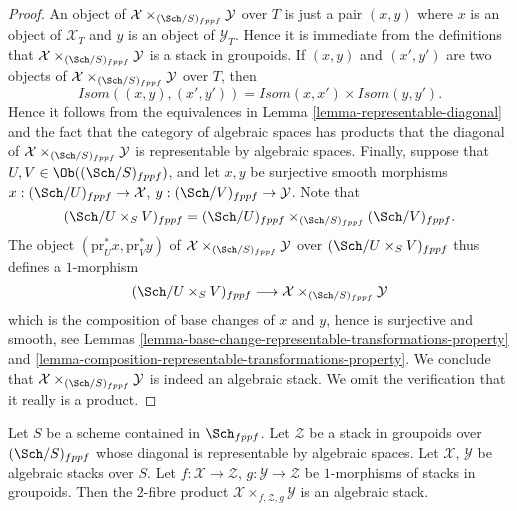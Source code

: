 \begin{proof}
An object of $\mathcal{X} \times_{(\Sch/S)_{fppf}} \mathcal{Y}$
over $T$ is just a pair $(x, y)$ where $x$ is an object of $\mathcal{X}_T$
and $y$ is an object of $\mathcal{Y}_T$. Hence it is immediate from
the definitions that
$\mathcal{X} \times_{(\Sch/S)_{fppf}} \mathcal{Y}$ is a
stack in groupoids. If $(x, y)$ and $(x', y')$ are
two objects of $\mathcal{X} \times_{(\Sch/S)_{fppf}} \mathcal{Y}$
over $T$, then
$$
\mathit{Isom}((x, y), (x', y')) =
\mathit{Isom}(x, x') \times \mathit{Isom}(y, y').
$$
Hence it follows from the equivalences in
Lemma \ref{lemma-representable-diagonal}
and the fact that the category of algebraic spaces has products
that the diagonal of $\mathcal{X} \times_{(\Sch/S)_{fppf}} \mathcal{Y}$
is representable by algebraic spaces.
Finally, suppose that $U, V \in \Ob((\Sch/S)_{fppf})$,
and let $x, y$ be surjective smooth morphisms
$x : (\Sch/U)_{fppf} \to \mathcal{X}$,
$y : (\Sch/V)_{fppf} \to \mathcal{Y}$.
Note that
$$
(\Sch/U \times_S V)_{fppf} =
(\Sch/U)_{fppf}
\times_{(\Sch/S)_{fppf}} (\Sch/V)_{fppf}.
$$
The object $(\text{pr}_U^*x, \text{pr}_V^*y)$ of
$\mathcal{X} \times_{(\Sch/S)_{fppf}} \mathcal{Y}$ over
$(\Sch/U \times_S V)_{fppf}$ thus defines a $1$-morphism
$$
(\Sch/U \times_S V)_{fppf}
\longrightarrow
\mathcal{X} \times_{(\Sch/S)_{fppf}} \mathcal{Y}
$$
which is the composition of base changes of $x$ and $y$, hence
is surjective and smooth, see
Lemmas \ref{lemma-base-change-representable-transformations-property} and
\ref{lemma-composition-representable-transformations-property}.
We conclude that $\mathcal{X} \times_{(\Sch/S)_{fppf}} \mathcal{Y}$
is indeed an algebraic stack. We omit the verification that it
really is a product.
\end{proof}

\begin{lemma}
\label{lemma-2-fibre-product-general}
Let $S$ be a scheme contained in $\Sch_{fppf}$.
Let $\mathcal{Z}$ be a stack in groupoids over $(\Sch/S)_{fppf}$
whose diagonal is representable by algebraic spaces.
Let $\mathcal{X}$, $\mathcal{Y}$ be algebraic stacks over $S$.
Let $f : \mathcal{X} \to \mathcal{Z}$, $g : \mathcal{Y} \to \mathcal{Z}$
be $1$-morphisms of stacks in groupoids. Then the $2$-fibre product
$\mathcal{X} \times_{f, \mathcal{Z}, g} \mathcal{Y}$ is an algebraic stack.
\end{lemma}

